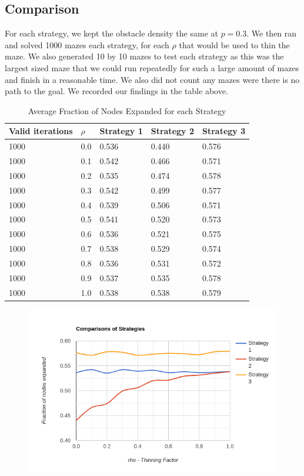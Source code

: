 \documentclass[11pt]{scrartcl} %
\begin{document}
\subsection{Comparison}
For each strategy, we kept the obstacle density the same at $p = 0.3$. We then ran and solved 1000 mazes each strategy, for each $\rho$ that would be used to thin the maze. We also generated 10 by 10 mazes to test each strategy as this was the largest sized maze that we could run repeatedly for such a large amount of mazes and finish in a reasonable time. We also did not count any mazes were there is no path to the goal. We recorded our findings in the table above.
\begin{center}

\begin{table}[H]
\begin{tabular}{|l|l|l|l|l|}

\hline
\textbf{Valid iterations} & \textbf{$\rho$} & \textbf{Strategy 1} & \textbf{Strategy 2} & \textbf{Strategy 3}	\\ \hline
1000 & 0.0 & 0.536 & 0.440 & 0.576 \\ \hline
1000 & 0.1 & 0.542 & 0.466 & 0.571 \\ \hline
1000 & 0.2 & 0.535 & 0.474 & 0.578 \\ \hline
1000 & 0.3 & 0.542 & 0.499 & 0.577 \\ \hline
1000 & 0.4 & 0.539 & 0.506 & 0.571 \\ \hline
1000 & 0.5 & 0.541 & 0.520 & 0.573 \\ \hline
1000 & 0.6 & 0.536 & 0.521 & 0.575 \\ \hline
1000 & 0.7 & 0.538 & 0.529 & 0.574 \\ \hline
1000 & 0.8 & 0.536 & 0.531 & 0.572 \\ \hline
1000 & 0.9 & 0.537 & 0.535 & 0.578 \\ \hline
1000 & 1.0 & 0.538 & 0.538 & 0.579 \\ \hline
\end{tabular}
\caption{Average Fraction of Nodes Expanded for each Strategy}
\end{table}

\begin{figure}[H]
 	\centering
  	\includegraphics*[scale=0.8]{line-graph-4.png}
	\label{fig:example}
 \end{figure}

\end{center}
\end{document}
